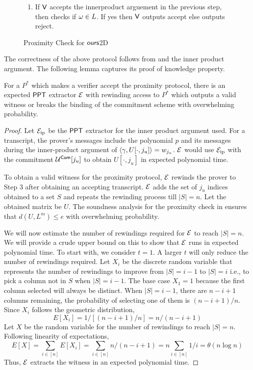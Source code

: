 \begin{figure}[h!]
\begin{framed}
\begin{enumerate}
			\item If $\mathsf{V}$ accepts the innerproduct arguement in the previous step, then checks if $\omega\in L$. If yes then $\mathsf{V}$ outputs accept else outputs reject.
			\end{enumerate}
		\end{framed}
	\caption{Proximity Check for $\textsf{ours}$2D}
	\end{figure}
The correctness of the above protocol follows from \cite{ligero} and the inner product argument. The following lemma captures its proof of knowledge property.
\begin{lemma}\label{lem:proximity}
For a $P^*$ which makes a verifier accept the proximity protocol, there is an expected $\mathsf{PPT}$ extractor $\mathcal{E}$ with rewinding access to $P^*$ which outputs a valid witness or breaks the binding of the commitment scheme with overwhelming probability.
\end{lemma}
\begin{proof}
Let $\mathcal{E}_{\mathrm{ip}}$ be the $\mathsf{PPT}$ extractor for the inner product argument used. For a transcript, the prover's messages include the polynomial $p$ and its messages during the inner-product argument of $\langle \gamma,U[\cdot, j_u]\rangle = w_{j_u}$.
$\mathcal{E}$ would use $\mathcal{E}_{\mathrm{ip}}$ with the commitment $\mathcal{U}^{\mathsf{Com}}[j_u]$ to obtain $U[\cdot,j_u]$ in expected polynomial time. 

To obtain a valid witness for the proximity protocol, $\mathcal{E}$ rewinds the prover to Step 3 after obtaining an accepting transcript. $\mathcal{E}$ adds the set of $j_u$ indices obtained to a set $S$ and repeats the rewinding process till $|S| = n$. Let the obtained matrix be $U$.
The soundness analysis for the proximity check in \cite{ligero} ensures that  $d(U, L^m) \leq e$ with overwhelming probability. 

We will now estimate the number of rewindings required for $\mathcal{E}$ to reach $|S| = n$. We will provide a crude upper bound on this to show that $\mathcal{E}$ runs in expected polynomial time. To start with, we consider $t=1$. A larger $t$ will only reduce the number of rewindings required. Let $X_i$ be the discrete random variable that represents the number of rewindings to improve from $|S| = i-1$ to $|S| = i$ i.e., to pick a column not in $S$ when $|S| = i-1$. The base case $X_1=1$ because the first column selected will always be distinct. When $|S| = i-1$, there are $n-i+1$ columns remaining, the probability of selecting one of them is $(n-i+1)/n$. Since $X_i$ follows the geometric distribution, 
\[
E[X_i] = 1/ [(n-i+1)/n] = n/ (n-i+1)
\]
Let $X$ be the random variable for the number of rewindings to reach $|S| = n$.
Following linearity of expectations, 
\[
E[X] = \sum_{i \in [n]} E[X_i] = \sum_{i \in [n]} n/ (n-i+1) = n \sum_{i \in [n]} 1/i = \theta (n \log n) 
\]
Thus, $\mathcal{E}$ extracts the witness in an expected polynomial time.
\end{proof}

